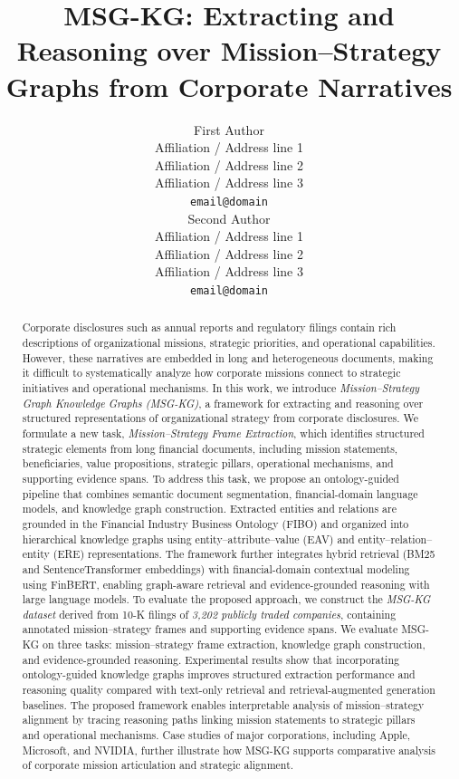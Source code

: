 \documentclass[11pt]{article}
\title{MSG-KG: Extracting and Reasoning over Mission–Strategy Graphs from Corporate Narratives}
\author{First Author \\
  Affiliation / Address line 1 \\
  Affiliation / Address line 2 \\
  Affiliation / Address line 3 \\
  \texttt{email@domain} \\\And
  Second Author \\
  Affiliation / Address line 1 \\
  Affiliation / Address line 2 \\
  Affiliation / Address line 3 \\
  \texttt{email@domain} \\}
\begin{document}
\maketitle
\begin{abstract}
Corporate disclosures such as annual reports and regulatory filings contain rich descriptions of organizational missions, strategic priorities, and operational capabilities. However, these narratives are embedded in long and heterogeneous documents, making it difficult to systematically analyze how corporate missions connect to strategic initiatives and operational mechanisms. 
In this work, we introduce \textit{Mission--Strategy Graph Knowledge Graphs (MSG-KG)}, a framework for extracting and reasoning over structured representations of organizational strategy from corporate disclosures. We formulate a new task, \textit{Mission--Strategy Frame Extraction}, which identifies structured strategic elements from long financial documents, including mission statements, beneficiaries, value propositions, strategic pillars, operational mechanisms, and supporting evidence spans.
To address this task, we propose an ontology-guided pipeline that combines semantic document segmentation, financial-domain language models, and knowledge graph construction. Extracted entities and relations are grounded in the Financial Industry Business Ontology (FIBO) and organized into hierarchical knowledge graphs using entity--attribute--value (EAV) and entity--relation--entity (ERE) representations. The framework further integrates hybrid retrieval (BM25 and SentenceTransformer embeddings) with financial-domain contextual modeling using FinBERT, enabling graph-aware retrieval and evidence-grounded reasoning with large language models.
To evaluate the proposed approach, we construct the \textit{MSG-KG dataset} derived from 10-K filings of \textit{3,202 publicly traded companies}, containing annotated mission--strategy frames and supporting evidence spans. We evaluate MSG-KG on three tasks: mission--strategy frame extraction, knowledge graph construction, and evidence-grounded reasoning. Experimental results show that incorporating ontology-guided knowledge graphs improves structured extraction performance and reasoning quality compared with text-only retrieval and retrieval-augmented generation baselines. 
The proposed framework enables interpretable analysis of mission--strategy alignment by tracing reasoning paths linking mission statements to strategic pillars and operational mechanisms. Case studies of major corporations, including Apple, Microsoft, and NVIDIA, further illustrate how MSG-KG supports comparative analysis of corporate mission articulation and strategic alignment.
\end{abstract}
\end{document}
